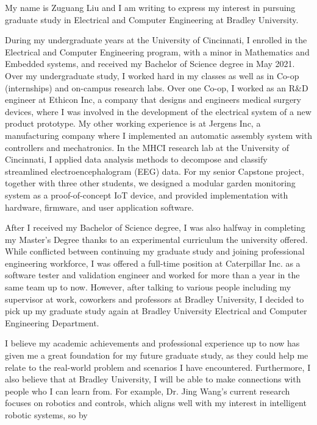 \documentclass[a4paper]{article}
\begin{document}
\par My name is Zuguang Liu and I am writing to express my interest in pursuing
graduate study in Electrical and Computer Engineering at Bradley University.
\par During my undergraduate years at the University of Cincinnati, I enrolled
in the Electrical and Computer Engineering program, with a minor in Mathematics
and Embedded systems, and received my Bachelor of Science degree in May 2021.
Over my undergraduate study, I worked hard in my classes as well as in Co-op
(internships) and on-campus research labs.
Over one Co-op, I worked as an R\&D engineer at Ethicon Inc, a company that
designs and engineers medical surgery devices, where I was involved in
the development of the electrical system of a new product prototype.
My other working experience is at Jergens Inc, a manufacturing company where I
implemented an automatic assembly system with controllers and mechatronics.
In the MHCI research lab at the University of Cincinnati, I applied data
analysis methods to decompose and classify streamlined electroencephalogram
(EEG) data.
For my senior Capstone project, together with three other students, we designed
a modular garden monitoring system as a proof-of-concept IoT device, and
provided implementation with hardware, firmware, and user application software.
\par After I received my Bachelor of Science degree, I was also halfway in
completing my Master's Degree thanks to an experimental curriculum the
university offered.
While conflicted between continuing my graduate study and joining professional
engineering workforce, I was offered a full-time position at Caterpillar Inc. as
a software tester and validation engineer and worked for more than a year in the
same team up to now.
However, after talking to various people including my supervisor at work,
coworkers and professors at Bradley University, I decided to pick up my
graduate study again at Bradley University Electrical and Computer Engineering
Department.
\par I believe my academic achievements and professional experience up to now
has given me a great foundation for my future graduate study, as they could help
me relate to the real-world problem and scenarios I have encountered.
Furthermore, I also believe that at Bradley University, I will be able to make
connections with people who I can learn from.
For example, Dr. Jing Wang's current research focuses on robotics and controls,
which aligns well with my interest in intelligent robotic systems, so by
\end{document}
